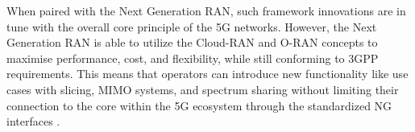 \documentclass{report}
\begin{document}
When paired with the Next Generation RAN, such framework innovations are in tune with the overall core principle of the 5G networks. However, the Next Generation RAN is able to utilize the Cloud-RAN and O-RAN concepts to maximise performance, cost, and flexibility, while still conforming to 3GPP requirements. This means that operators can introduce new functionality like use cases with slicing, MIMO systems, and spectrum sharing without limiting their connection to the core within the 5G ecosystem through the standardized NG interfaces \cite{3gpp_2020_procedures}.


\end{document}
